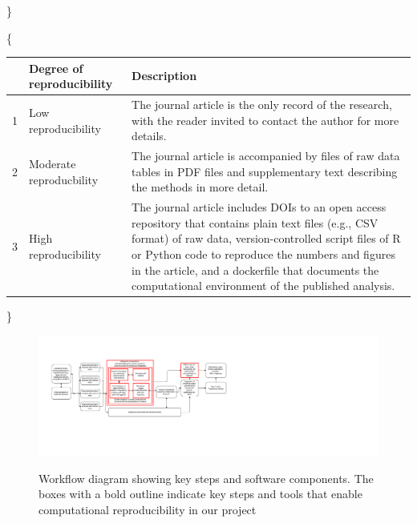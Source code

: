 \documentclass[american,man]{apa6}
\newcounter{author}
\begin{document}
\}

\clearpage

\newpage

\{\fontsize{8pt}{8pt}\selectfont

\begin{tabular}{lp{4cm}p{10cm}}
  \toprule
 & Degree of reproducibility & Description \\ 
  \midrule
1 & Low reproducibility & The journal article is the only record of the research, with the reader invited to contact the author for more details. \\ 
  2 & Moderate reproducbility & The journal article is accompanied by files of raw data tables in PDF files and supplementary text describing the methods in more detail. \\ 
  3 & High reproducibility & The journal article includes DOIs to an open access repository that contains plain text files (e.g., CSV format) of raw data, version-controlled script files of R or Python code to reproduce the numbers and figures in the article, and a dockerfile that documents the computational environment of the published analysis.  \\ 
   \bottomrule
\end{tabular}

\}

\begin{figure}[h!]
  \caption{Workflow diagram showing key steps and software components. The boxes with a bold outline indicate key steps and tools that enable computational reproducibility in our project}
  \centering
\includegraphics[width=\textwidth]{../figures/figure_workflow.pdf}
\label{fig:workflow}
\end{figure}

\newpage
\end{document}
